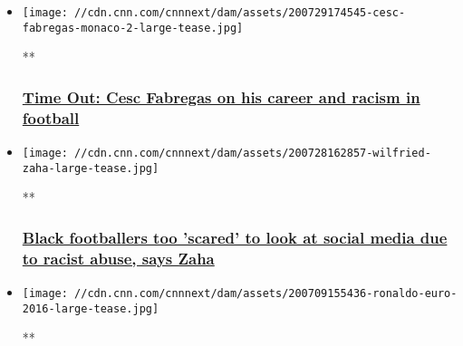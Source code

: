 \begin{itemize}
\item
  \href{/videos/sports/2020/07/29/cesc-fabregas-time-out-football-racism-coronavirus-arsenal-chelsea-spt-intl-orig-lon.cnn}{}

  \texttt{[image: //cdn.cnn.com/cnnnext/dam/assets/200729174545-cesc-fabregas-monaco-2-large-tease.jpg]}

  **

  \hypertarget{time-out-cesc-fabregas-on-his-career-and-racism-in-football}{%
  \subsubsection{\texorpdfstring{\href{/videos/sports/2020/07/29/cesc-fabregas-time-out-football-racism-coronavirus-arsenal-chelsea-spt-intl-orig-lon.cnn}{Time
  Out: Cesc Fabregas on his career and racism in
  football}}{Time Out: Cesc Fabregas on his career and racism in football}}\label{time-out-cesc-fabregas-on-his-career-and-racism-in-football}}
\item
  \href{/videos/sports/2020/07/28/wilfried-zaha-racist-abuse-social-media-black-lives-matter-football-spt-intl.cnn}{}

  \texttt{[image: //cdn.cnn.com/cnnnext/dam/assets/200728162857-wilfried-zaha-large-tease.jpg]}

  **

  \hypertarget{black-footballers-too-scared-to-look-at-social-media-due-to-racist-abuse-says-zaha}{%
  \subsubsection{\texorpdfstring{\href{/videos/sports/2020/07/28/wilfried-zaha-racist-abuse-social-media-black-lives-matter-football-spt-intl.cnn}{Black
  footballers too 'scared' to look at social media due to racist abuse,
  says
  Zaha}}{Black footballers too 'scared' to look at social media due to racist abuse, says Zaha}}\label{black-footballers-too-scared-to-look-at-social-media-due-to-racist-abuse-says-zaha}}
\item
  \href{/videos/sports/2020/07/09/portugal-euro-2016-victory-cedric-soares-jose-fonte-cristiano-ronaldo-football-spt-intl-lon-orig-cmd.cnn}{}

  \texttt{[image: //cdn.cnn.com/cnnnext/dam/assets/200709155436-ronaldo-euro-2016-large-tease.jpg]}

  **

  \hypertarget{how-portugal-became-one-of-footballs-most-unlikely-champions}{%
}
\end{itemize}
